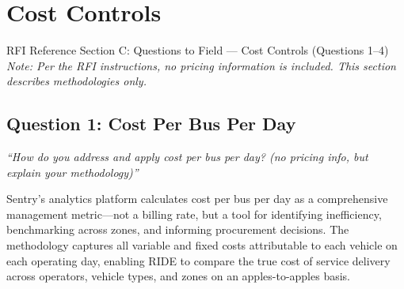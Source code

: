 \section{\texorpdfstring{\color{MidnightBlue}Cost Controls}{Cost Controls}}

\begin{sidebar}{RFI Reference}
Section C: Questions to Field --- Cost Controls (Questions 1--4)\\[0.3cm]
\textit{Note: Per the RFI instructions, no pricing information is included. This section describes methodologies only.}
\end{sidebar}

\subsection{Question 1: Cost Per Bus Per Day}
\textit{``How do you address and apply cost per bus per day? (no pricing info, but explain your methodology)''}

\vspace{0.3cm}

Sentry's analytics platform calculates cost per bus per day as a comprehensive management metric---not a billing rate, but a tool for identifying inefficiency, benchmarking across zones, and informing procurement decisions. The methodology captures all variable and fixed costs attributable to each vehicle on each operating day, enabling RIDE to compare the true cost of service delivery across operators, vehicle types, and zones on an apples-to-apples basis.


